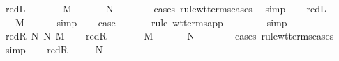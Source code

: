 \begin{isabellebody}
\ red{\isacharunderscore}L{\isacharparenleft}{}{\isacharparenright}\ \isamarkupfalse%
\ {\isasymtau}\ \ {}{\isacharcolon}\ {\isachardoublequoteopen}{\isasymGamma}\ {\isasymturnstile}\ M\ {\isacharcolon}\ {\isasymtau}\ {\isasymrightarrow}\ {\isasymsigma}{\isachardoublequoteclose}\ {\isachardoublequoteopen}{\isasymGamma}\ {\isasymturnstile}\ N\ {\isacharcolon}\ {\isasymtau}{\isachardoublequoteclose}\isanewline
\ \ \ \ \isamarkupfalse%
\ {\isacharparenleft}cases\ rule{\isacharcolon}wt{\isacharunderscore}terms{\isachardot}cases{\isacharparenright}\ \isamarkupfalse%
\ simp\isanewline
\ \ \isamarkupfalse%
\ red{\isacharunderscore}L{\isacharparenleft}{}{\isacharparenright}\ \isamarkupfalse%
\ {\isachardoublequoteopen}{\isasymGamma}\ {\isasymturnstile}\ M{\isacharprime}\ {\isacharcolon}\ {\isasymtau}\ {\isasymrightarrow}\ {\isasymsigma}{\isachardoublequoteclose}\ \isamarkupfalse%
\ simp\isanewline
\ \ \isamarkupfalse%
\ {\isacharquery}case\ \isanewline
\ \ \ \ \isamarkupfalse%
\ {\isacharparenleft}rule\ wt{\isacharunderscore}terms{\isachardot}app{\isacharparenright}\isanewline
\ \ \ \ \isamarkupfalse%
\ {}\ \isamarkupfalse%
\ simp\isanewline
{}\isamarkupfalse%
\isanewline
{}\isamarkupfalse%
\ {\isacharparenleft}red{\isacharunderscore}R\ N\ N{\isacharprime}\ M{\isacharparenright}\isanewline
\ \ \isamarkupfalse%
\ red{\isacharunderscore}R{\isacharparenleft}{}{\isacharparenright}\ \isamarkupfalse%
\ {\isasymtau}\ \ {}{\isacharcolon}\ {\isachardoublequoteopen}{\isasymGamma}\ {\isasymturnstile}\ M\ {\isacharcolon}\ {\isasymtau}\ {\isasymrightarrow}\ {\isasymsigma}{\isachardoublequoteclose}\ {\isachardoublequoteopen}{\isasymGamma}\ {\isasymturnstile}\ N\ {\isacharcolon}\ {\isasymtau}{\isachardoublequoteclose}\isanewline
\ \ \ \ \isamarkupfalse%
\ {\isacharparenleft}cases\ rule{\isacharcolon}wt{\isacharunderscore}terms{\isachardot}cases{\isacharparenright}\ \isamarkupfalse%
\ simp\isanewline
\ \ \isamarkupfalse%
\ red{\isacharunderscore}R{\isacharparenleft}{}{\isacharparenright}\ \isamarkupfalse%
\ {}{\isacharcolon}\ {\isachardoublequoteopen}{\isasymGamma}\ {\isasymturnstile}\ N{\isacharprime}\ {\isacharcolon}\ {\isasymtau}{\isachardoublequoteclose}\ \isamarkupfalse%

\end{isabellebody}
